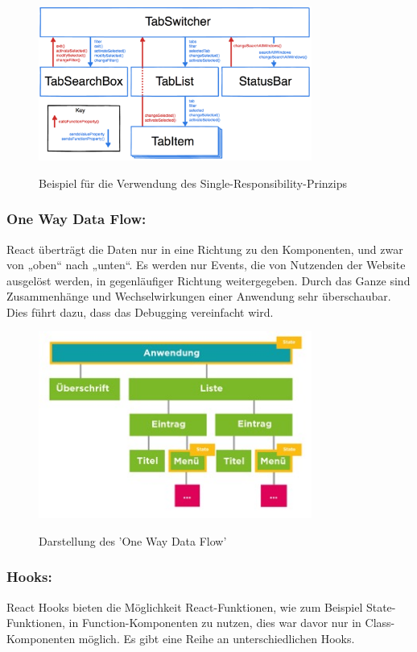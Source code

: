 \begin{figure}[H]
  \centering
  \includegraphics[width=0.8\textwidth]{pics/SRP.png}
  \caption{Beispiel für die Verwendung des Single-Responsibility-Prinzips}
  \cite{SRP}
\end{figure}

\subsubsection{One Way Data Flow:}
React überträgt die Daten nur in eine Richtung zu den Komponenten, und zwar von „oben“ nach „unten“. Es werden nur Events, die von Nutzenden der Website ausgelöst werden, in gegenläufiger Richtung weitergegeben. Durch das Ganze sind Zusammenhänge und Wechselwirkungen einer Anwendung sehr überschaubar. Dies führt dazu, dass das Debugging vereinfacht wird.
\cite{owdf}

\begin{figure}[H]
  \centering
  \includegraphics[width=0.8\textwidth]{pics/owdf.jpg}
  \caption{Darstellung des 'One Way Data Flow'}
  \cite{owdf}
\end{figure}

\subsubsection{Hooks:}
React Hooks bieten die Möglichkeit React-Funktionen, wie zum Beispiel State-Funktionen, in Function-Komponenten zu nutzen, dies war davor nur in Class- Komponenten möglich. Es gibt eine Reihe an unterschiedlichen Hooks.

